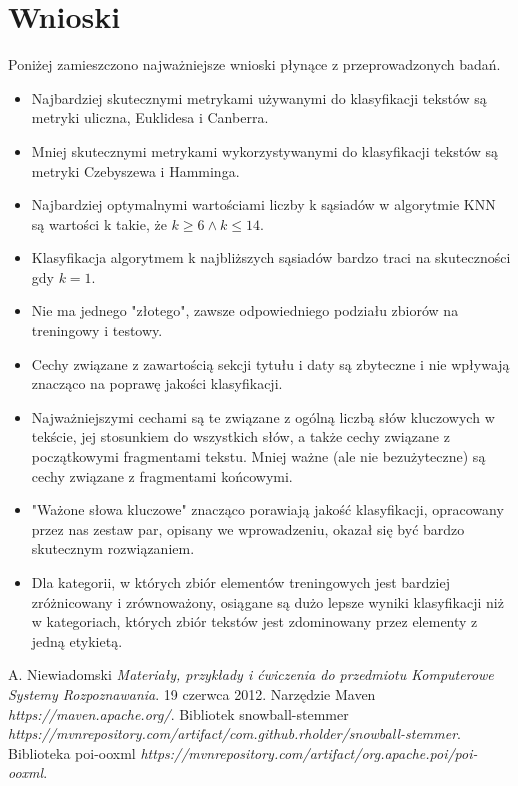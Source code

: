 \documentclass{classrep}
\begin{document}
\section{Wnioski}
Poniżej zamieszczono najważniejsze wnioski płynące z przeprowadzonych badań.
\begin{itemize}[label=$\bullet$\scshape\bfseries]
\item Najbardziej skutecznymi metrykami używanymi do klasyfikacji tekstów są metryki uliczna, Euklidesa i Canberra.
\item Mniej skutecznymi metrykami wykorzystywanymi do klasyfikacji tekstów są metryki Czebyszewa i Hamminga.
\item Najbardziej optymalnymi wartościami liczby k sąsiadów w algorytmie KNN są wartości k takie, że $k\geq6 \land k\leq14$.
\item Klasyfikacja algorytmem k najbliższych sąsiadów bardzo traci na skuteczności gdy $k=1$.
\item Nie ma jednego "złotego", zawsze odpowiedniego podziału zbiorów na treningowy i testowy.
\item Cechy związane z zawartością sekcji tytułu i daty są zbyteczne i nie wpływają znacząco na poprawę jakości klasyfikacji.
\item Najważniejszymi cechami są te związane z ogólną liczbą słów kluczowych w tekście, jej stosunkiem do wszystkich słów, a także cechy związane z początkowymi fragmentami tekstu. Mniej ważne (ale nie bezużyteczne) są cechy związane z fragmentami końcowymi.
\item "Ważone słowa kluczowe" znacząco porawiają jakość klasyfikacji, opracowany przez nas zestaw par, opisany we wprowadzeniu, okazał się być bardzo skutecznym rozwiązaniem.
\item Dla kategorii, w których zbiór elementów treningowych jest bardziej zróżnicowany i zrównoważony, osiągane są dużo lepsze wyniki klasyfikacji niż w kategoriach, których zbiór tekstów jest zdominowany przez elementy z jedną etykietą.
\end{itemize}

\begin{thebibliography}{4}
A. Niewiadomski
\textit{Materiały, przykłady i ćwiczenia do przedmiotu Komputerowe Systemy Rozpoznawania}. 
19 czerwca 2012.
Narzędzie Maven\newline
\textit{https://maven.apache.org/}. 
Bibliotek snowball-stemmer\newline
\textit{https://mvnrepository.com/artifact/com.github.rholder/snowball-stemmer}. 
Biblioteka poi-ooxml\newline
\textit{https://mvnrepository.com/artifact/org.apache.poi/poi-ooxml}. 
\end{thebibliography}
\end{document}
